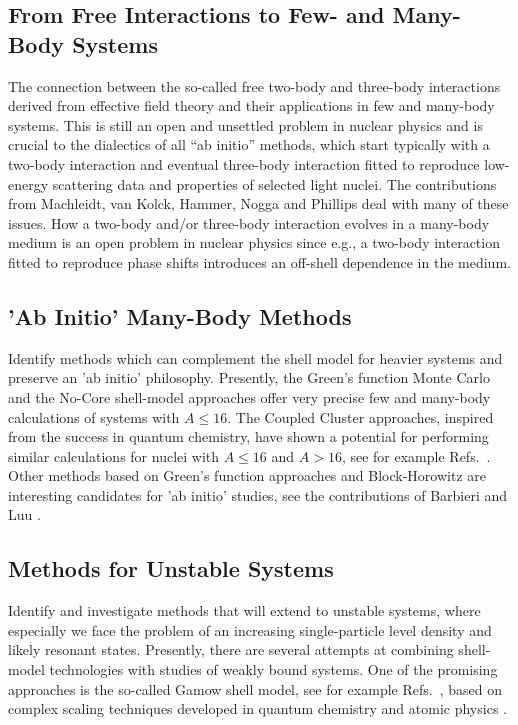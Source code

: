 \documentclass[12pt]{iopart}
\begin{document}
\subsection{From Free Interactions to Few- and Many-Body Systems}  

The connection between the so-called free two-body and three-body interactions
derived from effective field theory and their applications in few and many-body systems.
This is still an open and unsettled problem in nuclear physics and is crucial to the 
dialectics of all ``ab initio'' methods, which start 
typically with a two-body interaction and eventual three-body interaction 
fitted to reproduce low-energy scattering data and properties
of selected light nuclei. The contributions from Machleidt, van Kolck, Hammer,
Nogga and Phillips deal with many of these issues.  
How a two-body and/or three-body interaction evolves in a many-body medium is an 
open problem in nuclear physics since e.g., a two-body interaction fitted to reproduce
phase shifts introduces an off-shell dependence in the medium.

\subsection{'Ab Initio' Many-Body Methods}

Identify methods which can complement the shell model for heavier systems and
preserve an 'ab initio' philosophy. Presently, the Green's function Monte Carlo
\cite{bobsteve1,bobsteve2} and the No-Core shell-model \cite{bruce1,bruce2,bruce3}
approaches offer very precise few and many-body calculations of systems with 
$A\le 16$.   The Coupled Cluster approaches, inspired from the success in 
quantum chemistry, have shown a potential for performing similar calculations
for nuclei with $A\le 16$ and $A> 16$, see for example Refs.~\cite{cc1,cc2}.
Other methods based on Green's function approaches and 
Block-Horowitz are interesting candidates for 'ab initio' studies, see the 
contributions of Barbieri \cite{carlo} and Luu \cite{tom}.

\subsection{Methods for Unstable Systems} 

Identify and investigate methods that will extend to unstable systems, where
especially we face the problem of an increasing single-particle level density and 
likely resonant states.
Presently, there are several attempts at  combining shell-model 
technologies with  studies of weakly bound systems. One of the promising approaches is 
the so-called Gamow shell model, see for example Refs.~\cite{witek,roberto,hagen}, 
based on 
complex scaling techniques developed in quantum chemistry and atomic physics 
\cite{nimrod}.
\end{document}
